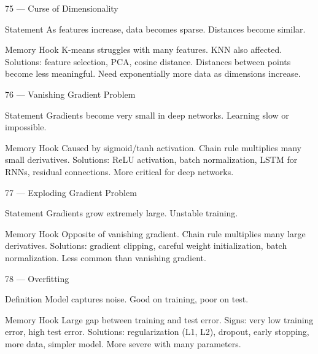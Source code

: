 \documentclass[aspectratio=169,8pt]{beamer}
\begin{document}
	\begin{frame}{75 --- Curse of Dimensionality}
		\begin{block}{Statement}
			As features increase, data becomes sparse. Distances become similar.
		\end{block}
		\begin{block}{Memory Hook}
			K-means struggles with many features. KNN also affected. Solutions: feature selection, PCA, cosine distance. Distances between points become less meaningful. Need exponentially more data as dimensions increase.
		\end{block}
	\end{frame}
	
	\begin{frame}{76 --- Vanishing Gradient Problem}
		\begin{block}{Statement}
			Gradients become very small in deep networks. Learning slow or impossible.
		\end{block}
		\begin{block}{Memory Hook}
			Caused by sigmoid/tanh activation. Chain rule multiplies many small derivatives. Solutions: ReLU activation, batch normalization, LSTM for RNNs, residual connections. More critical for deep networks.
		\end{block}
	\end{frame}
	
	\begin{frame}{77 --- Exploding Gradient Problem}
		\begin{block}{Statement}
			Gradients grow extremely large. Unstable training.
		\end{block}
		\begin{block}{Memory Hook}
			Opposite of vanishing gradient. Chain rule multiplies many large derivatives. Solutions: gradient clipping, careful weight initialization, batch normalization. Less common than vanishing gradient.
		\end{block}
	\end{frame}
	
	\begin{frame}{78 --- Overfitting}
		\begin{block}{Definition}
			Model captures noise. Good on training, poor on test.
		\end{block}
		\begin{block}{Memory Hook}
			Large gap between training and test error. Signs: very low training error, high test error. Solutions: regularization (L1, L2), dropout, early stopping, more data, simpler model. More severe with many parameters.
		\end{block}
	\end{frame}
	
\end{document}
